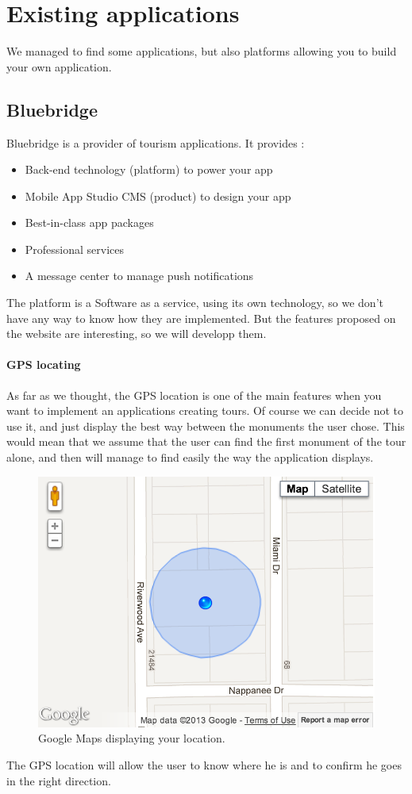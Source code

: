 \section{Existing applications}

We managed to find some applications, but also platforms allowing you to build your own application.

	\subsection{Bluebridge}
	Bluebridge is a provider of tourism applications. It provides :
	\begin{itemize}
		\item  Back-end technology (platform) to power your app
		\item  Mobile App Studio CMS (product) to design your app
		\item  Best-in-class app packages
		\item  Professional services
		\item  A message center to manage push notifications
	\end{itemize}

The platform is a Software as a service, using its own technology, so we don't have any way to know how they are implemented. But the features proposed on the website are interesting, so we will developp them.

\paragraph{GPS locating} As far as we thought, the GPS location is one of the main features when you want to implement an applications creating tours. Of course we can decide not to use it, and just display the best way between the monuments the user chose. This would mean that we assume that the user can find the first monument of the tour alone, and then will manage to find easily the way the application displays.
\begin{figure}[h!]
	\centering
	\includegraphics[scale=0.37]{input/current-location.png}
	\caption{Google Maps displaying your location.}
	\label{fig:location}
\end{figure}
The GPS location will allow the user to know where he is and to confirm he goes in the right direction.


